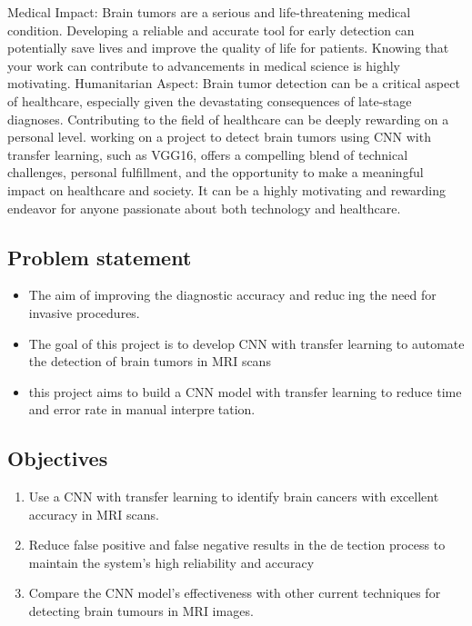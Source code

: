 Medical Impact: Brain tumors are a serious and life-threatening medical condition. Developing a reliable and accurate tool for early detection can potentially save lives and improve the quality of life for patients. Knowing that your work can contribute to advancements in medical science is highly motivating.
Humanitarian Aspect: Brain tumor detection can be a critical aspect of healthcare, especially given the devastating consequences of late-stage diagnoses. Contributing to the field of healthcare can be deeply rewarding on a personal level.
working on a project to detect brain tumors using CNN with transfer learning, such as VGG16, offers a compelling blend of technical challenges, personal fulfillment, and the opportunity to make a meaningful impact on healthcare and society. It can be a highly motivating and rewarding endeavor for anyone passionate about both technology and healthcare.
\vspace{0.25cm}

\subsection{Problem statement}

\begin{itemize}
\item   The aim of improving the diagnostic accuracy and reducing the need for invasive procedures.
\item  The goal of this project is to develop CNN with transfer
learning to automate the detection of brain tumors in MRI
scans
\item  this project aims to build a CNN model with transfer
learning to reduce time and error rate in manual interpretation.
\end{itemize}

\subsection{Objectives}


\begin{enumerate}
\item  Use a CNN with transfer learning to identify brain
cancers with excellent accuracy in MRI scans.
\item  Reduce false positive and false negative results in the detection process to maintain the system’s high reliability
and accuracy

\item  Compare the CNN model’s effectiveness with other
current techniques for detecting brain tumours in MRI
images.
\end{enumerate}

